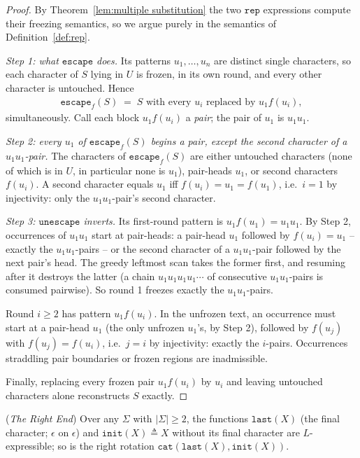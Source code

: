 \documentclass[runningheads,envcountsect]{llncs}
\begin{document}
\begin{proof}
    By Theorem~\ref{lem:multiple substitution} the two $\mathtt{rep}$ expressions compute their freezing semantics, so we argue purely in the semantics of Definition~\ref{def:rep}.

    \emph{Step 1: what $\mathtt{escape}$ does.} Its patterns $u_1, \dots, u_n$ are distinct single characters, so each character of $S$ lying in $U$ is frozen, in its own round, and every other character is untouched. Hence
    \begin{align}
        \mathtt{escape}_f(S) \;=\; S\text{ with every } u_i \text{ replaced by } u_1 f(u_i),
    \end{align}
    simultaneously. Call each block $u_1f(u_i)$ a \emph{pair}; the pair of $u_1$ is $u_1u_1$.

    \emph{Step 2: every $u_1$ of $\mathtt{escape}_f(S)$ begins a pair, except the second character of a $u_1u_1$-pair.} The characters of $\mathtt{escape}_f(S)$ are either untouched characters (none of which is in $U$, in particular none is $u_1$), pair-heads $u_1$, or second characters $f(u_i)$. A second character equals $u_1$ iff $f(u_i) = u_1 = f(u_1)$, i.e.\ $i = 1$ by injectivity: only the $u_1u_1$-pair's second character.

    \emph{Step 3: $\mathtt{unescape}$ inverts.} Its first-round pattern is $u_1f(u_1) = u_1u_1$. By Step 2, occurrences of $u_1u_1$ start at pair-heads: a pair-head $u_1$ followed by $f(u_i) = u_1$ -- exactly the $u_1u_1$-pairs -- or the second character of a $u_1u_1$-pair followed by the next pair's head. The greedy leftmost scan takes the former first, and resuming after it destroys the latter (a chain $u_1u_1u_1u_1\cdots$ of consecutive $u_1u_1$-pairs is consumed pairwise). So round 1 freezes exactly the $u_1u_1$-pairs.

    Round $i \geq 2$ has pattern $u_1 f(u_i)$. In the unfrozen text, an occurrence must start at a pair-head $u_1$ (the only unfrozen $u_1$'s, by Step 2), followed by $f(u_j)$ with $f(u_j) = f(u_i)$, i.e.\ $j = i$ by injectivity: exactly the $i$-pairs. Occurrences straddling pair boundaries or frozen regions are inadmissible.

    Finally, replacing every frozen pair $u_1f(u_i)$ by $u_i$ and leaving untouched characters alone reconstructs $S$ exactly.
\end{proof}

\begin{proposition}
    (\emph{The Right End})
    \label{prop:last}
    Over any $\Sigma$ with $|\Sigma| \geq 2$, the functions $\mathtt{last}(X)$ (the final character; $\epsilon$ on $\epsilon$) and $\mathtt{init}(X) \triangleq X$ without its final character are $L$-expressible; so is the right rotation $\mathtt{cat}(\mathtt{last}(X), \mathtt{init}(X))$.
\end{proposition}
\end{document}

